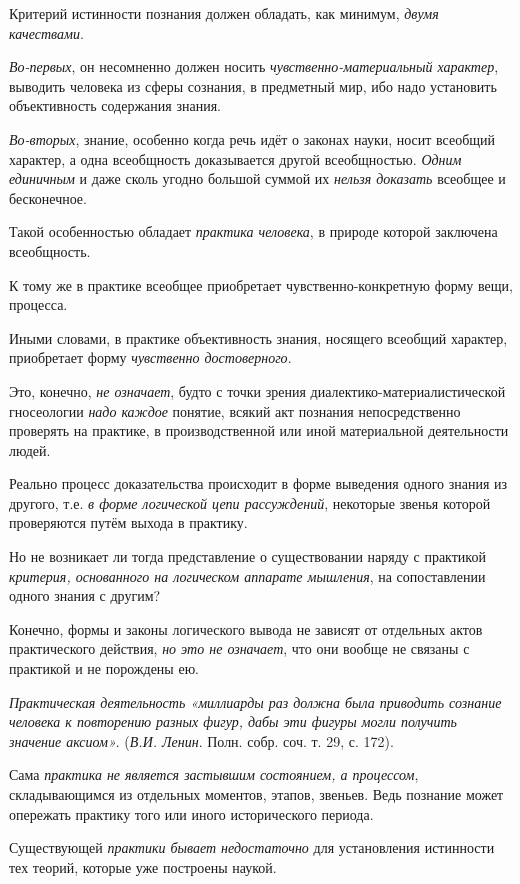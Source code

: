 \documentclass[a4paper,14pt,russian]{extreport}
\begin{document}
Критерий истинности познания должен обладать, как минимум, \emph{двумя качествами}.

\emph{Во-первых}, он несомненно должен носить \emph{чувственно-материальный характер}, выводить человека из сферы сознания, в предметный мир, ибо надо установить объективность содержания знания.

\emph{Во-вторых}, знание, особенно когда речь идёт о законах науки, носит всеобщий характер, а одна всеобщность доказывается другой всеобщностью. \emph{Одним единичным} и даже сколь угодно большой суммой их \emph{нельзя доказать} всеобщее и бесконечное.

Такой особенностью обладает \emph{практика человека}, в природе которой заключена всеобщность.

К тому же в практике всеобщее приобретает чувственно-конкретную форму вещи, процесса.

Иными словами, в практике объективность знания, носящего всеобщий характер, приобретает форму \emph{чувственно достоверного}.

Это, конечно, \emph{не означает}, будто с точки зрения диалектико-материалистической гносеологии \emph{надо каждое} понятие, всякий акт познания непосредственно проверять на практике, в производственной или иной материальной деятельности людей.

Реально процесс доказательства происходит в форме выведения одного знания из другого, т.е. \emph{в форме логической цепи рассуждений}, некоторые звенья которой проверяются путём выхода в практику.

Но не возникает ли тогда представление о существовании наряду с практикой \emph{критерия, основанного на логическом аппарате мышления}, на сопоставлении одного знания с другим?

Конечно, формы и законы логического вывода не зависят от отдельных актов практического действия, \emph{но это не означает}, что они вообще не связаны с практикой и не порождены ею.

\emph{Практическая деятельность «миллиарды раз должна была приводить сознание человека к повторению разных фигур, дабы эти фигуры могли получить значение аксиом»}. (\emph{В.И. Ленин}. Полн. собр. соч. т. 29, с. 172).

Сама \emph{практика не является застывшим состоянием, а процессом}, складывающимся из отдельных моментов, этапов, звеньев. Ведь познание может опережать практику того или иного исторического периода.

Существующей \emph{практики бывает недостаточно} для установления истинности тех теорий, которые уже построены наукой.
\end{document}
